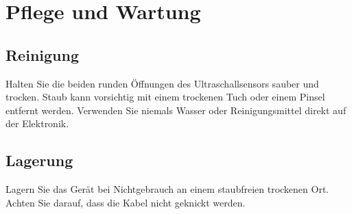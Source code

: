 %
%

\chapter{Pflege und Wartung}

\section{Reinigung}
Halten Sie die beiden runden Öffnungen des Ultraschallsensors sauber und trocken. Staub kann vorsichtig mit einem trockenen Tuch oder einem Pinsel entfernt werden. Verwenden Sie niemals Wasser oder Reinigungsmittel direkt auf der Elektronik.

\section{Lagerung}
Lagern Sie das Gerät bei Nichtgebrauch an einem staubfreien trockenen Ort. Achten Sie darauf, dass die Kabel nicht geknickt werden.



